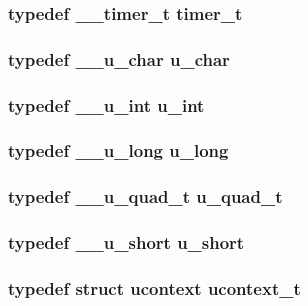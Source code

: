 \subsubsection[{timer\_\-t}]{\setlength{\rightskip}{0pt plus 5cm}typedef {\bf \_\-\_\-timer\_\-t} {\bf timer\_\-t}}\label{tp_8c_ac548f50ba0483d29005b0518f5d9dc46}
\subsubsection[{u\_\-char}]{\setlength{\rightskip}{0pt plus 5cm}typedef {\bf \_\-\_\-u\_\-char} {\bf u\_\-char}}\label{tp_8c_aba6ba68259a4cd3ad7e5867d5e897f79}
\subsubsection[{u\_\-int}]{\setlength{\rightskip}{0pt plus 5cm}typedef {\bf \_\-\_\-u\_\-int} {\bf u\_\-int}}\label{tp_8c_a303b68d859bad123760807ce358bbfac}
\subsubsection[{u\_\-long}]{\setlength{\rightskip}{0pt plus 5cm}typedef {\bf \_\-\_\-u\_\-long} {\bf u\_\-long}}\label{tp_8c_a57c4f26fd4c9450351bb7682e75a2bc8}
\subsubsection[{u\_\-quad\_\-t}]{\setlength{\rightskip}{0pt plus 5cm}typedef {\bf \_\-\_\-u\_\-quad\_\-t} {\bf u\_\-quad\_\-t}}\label{tp_8c_af143f178cbab26bbf6cf03e7f5d0c087}
\subsubsection[{u\_\-short}]{\setlength{\rightskip}{0pt plus 5cm}typedef {\bf \_\-\_\-u\_\-short} {\bf u\_\-short}}\label{tp_8c_a5a194b1436ab38b9b1b1d7f75bdb8b38}
\subsubsection[{ucontext\_\-t}]{\setlength{\rightskip}{0pt plus 5cm}typedef struct {\bf ucontext}  {\bf ucontext\_\-t}}\label{tp_8c_a0f7d867a821848e40344c33fd2528233}
